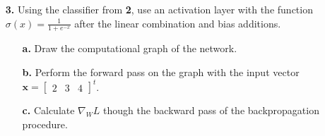 \documentclass[ 12pt ]{article}
\begin{document}
\begin{enumerate}
\begin{proof}[Solution]
\begin{enumerate}
				\item[\textbf{b.}] Now that we have the expression of the classifier, the output provided $\textbf{x}$ is $$(\textbf{gf})(\textbf{x}) = \begin{bmatrix} 9 & 4 & -6 \\ 1 &
					0 & 4 \end{bmatrix} \begin{bmatrix} 2 \\ -5 \\ 1 \end{bmatrix} + \begin{bmatrix} 7 \\ 0 \end{bmatrix} = \begin{bmatrix} -1 \\ 6 \end{bmatrix}.$$

				\item[\textbf{c.}] After observing the resulting output, $\begin{bmatrix} -1 & 6 \end{bmatrix}^t$, we can see that the score is -1 and 6 for class one and two,
					respectively. Therefore, according to the classifier, $\textbf{x}$ is more akin to class two since score of class two exceeds that of class one and so $\textbf{x}$
					would be classified as class two.

				\item[\textbf{d.}] Assuming that class one was the correct class for $\textbf{x}$, the hinge loss can be calculated as $$L_1 = \sum_{j \neq 1} \max \{ 0, s_j - s_1 +
					1 \} = \max \{ 0, s_2 - s_1 + 1 \} = \max \{ 0, 6 - (-1) + 1 \} = 8.$$

				\item[\textbf{e.}] Again, assuming that class one was the correct class for $\textbf{x}$, the softmax loss can be calculated as $$L_1 = -\ln \frac{e^{s_1}}{\sum_{j
					} e^{s_j}} = -\ln \frac{e^{-1}}{e^{-1} + e^6} = \ln (1 + e^7) \approx 7.$$
			\end{enumerate}
		\end{proof}


	\item[\textbf{3.}] Using the classifier from \textbf{2}, use an activation layer with the function $\sigma(x) = \frac{1}{1 + e^{-x}}$ after the linear combination and bias additions.
		\begin{enumerate}
			\item[\textbf{a.}] Draw the computational graph of the network.
			\item[\textbf{b.}] Perform the forward pass on the graph with the input vector $\textbf{x} = \begin{bmatrix} 2 & 3 & 4 \end{bmatrix}^t$.
			\item[\textbf{c.}] Calculate $\nabla_W L$ though the backward pass of the backpropagation procedure.
		\end{enumerate}


\end{enumerate}
\end{document}
